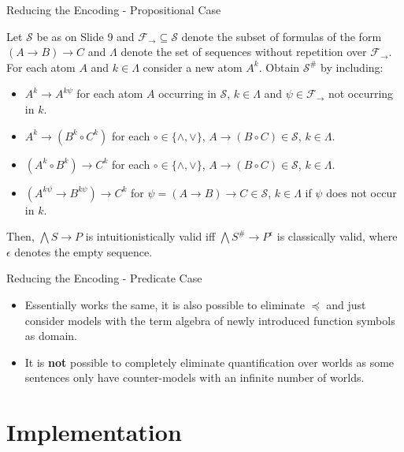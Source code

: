 \documentclass{cubeamer}
\begin{document}
	\begin{frame}{Reducing the Encoding - Propositional Case}
		\begin{theorem}
			\label{thm:reduction-propositional}
			Let $\mathcal S$ be as on Slide 9 and $\mathcal F_\to\subseteq\mathcal S$ denote the subset of formulas of the form $(A\to B)\to C$ and $\Lambda$ denote the set of sequences without repetition over $\mathcal F_\to$. For each atom $A$ and $k\in\Lambda$ consider a new atom $A^k$. Obtain $\mathcal S^\#$ by including:
			\begin{itemize}
				\item $A^k\to A^{k\psi}$ for each atom $A$ occurring in $\mathcal S$, $k\in\Lambda$ and $\psi\in\mathcal F_\to$ not occurring in $k$.
				\item $A^k\to (B^k\circ C^k)$ for each $\circ\in\{\wedge,\vee\}$, $A\to (B\circ C)\in\mathcal S$, $k\in\Lambda$.
				\item $(A^k\circ B^k)\to C^k$ for each $\circ\in\{\wedge,\vee\}$, $A\to (B\circ C)\in\mathcal S$, $k\in\Lambda$.
				\item $(A^{k\psi}\to B^{k\psi})\to C^k$ for $\psi = (A\to B)\to C\in\mathcal S$, $k\in\Lambda$ if $\psi$ does not occur in $k$.
			\end{itemize}
			Then, $\bigwedge S\to P$ is intuitionistically valid iff $\bigwedge S^\#\to P^\epsilon$ is classically valid, where $\epsilon$ denotes the empty sequence.
		\end{theorem}
	\end{frame}
	
	\begin{frame}{Reducing the Encoding - Predicate Case}
		\begin{itemize}
			\item Essentially works the same, it is also possible to eliminate $\preceq$ and just consider models with the term algebra of newly introduced function symbols as domain.
			\item It is \textbf{not} possible to completely eliminate quantification over worlds as some sentences only have counter-models with an infinite number of worlds.
		\end{itemize}
	\end{frame}

	\section{Implementation}
	
\end{document}
